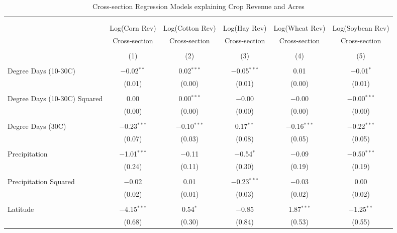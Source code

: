 \documentclass[10pt]{article}
\begin{document}
\newpage
\begin{table}[!htbp] \centering 
  \caption{Cross-section Regression Models explaining Crop Revenue and Acres} 
  \label{} 
\footnotesize 
\begin{tabular}{@{\extracolsep{5pt}}lccccc} 
\\[-1.8ex]\hline 
\hline \\[-1.8ex] 
\\[-1.8ex] & Log(Corn Rev) & Log(Cotton Rev) & Log(Hay Rev) & Log(Wheat Rev) & Log(Soybean Rev) \\ 
 & Cross-section & Cross-section & Cross-section & Cross-section & Cross-section \\ 
\\[-1.8ex] & (1) & (2) & (3) & (4) & (5)\\ 
\hline \\[-1.8ex] 
 Degree Days (10-30C) & $-$0.02$^{**}$ & 0.02$^{***}$ & $-$0.05$^{***}$ & 0.01 & $-$0.01$^{*}$ \\ 
  & (0.01) & (0.00) & (0.01) & (0.00) & (0.01) \\ 
  & & & & & \\ 
 Degree Days (10-30C) Squared & 0.00 & 0.00$^{***}$ & $-$0.00 & $-$0.00 & $-$0.00$^{***}$ \\ 
  & (0.00) & (0.00) & (0.00) & (0.00) & (0.00) \\ 
  & & & & & \\ 
 Degree Days (30C) & $-$0.23$^{***}$ & $-$0.10$^{***}$ & 0.17$^{**}$ & $-$0.16$^{***}$ & $-$0.22$^{***}$ \\ 
  & (0.07) & (0.03) & (0.08) & (0.05) & (0.05) \\ 
  & & & & & \\ 
 Precipitation & $-$1.01$^{***}$ & $-$0.11 & $-$0.54$^{*}$ & $-$0.09 & $-$0.50$^{***}$ \\ 
  & (0.24) & (0.11) & (0.30) & (0.19) & (0.19) \\ 
  & & & & & \\ 
 Precipitation Squared & $-$0.02 & 0.01 & $-$0.23$^{***}$ & $-$0.03 & 0.00 \\ 
  & (0.02) & (0.01) & (0.03) & (0.02) & (0.02) \\ 
  & & & & & \\ 
 Latitude & $-$4.15$^{***}$ & 0.54$^{*}$ & $-$0.85 & 1.87$^{***}$ & $-$1.25$^{**}$ \\ 
  & (0.68) & (0.30) & (0.84) & (0.53) & (0.55) \\ 

\end{tabular}
\end{table}
\end{document}
